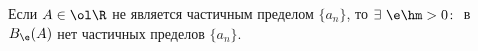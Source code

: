 
Если $A\in\ol\R$ не является частичным пределом $\{a_n\}$, то
$\exists\  \e\hm>0\colon$ в~$B_\e(A)$ нет частичных пределов $\{a_n\}$.
